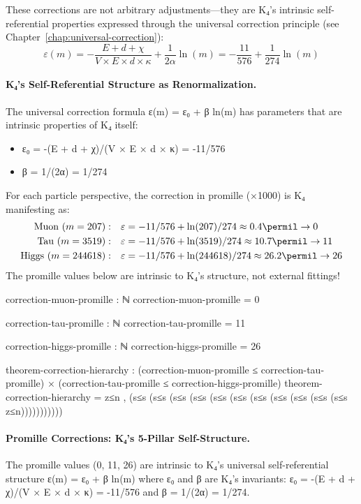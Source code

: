 \documentclass[11pt,a4paper]{book}
\begin{document}
These corrections are not arbitrary adjustments—they are K₄'s intrinsic self-referential properties expressed through the universal correction principle (see Chapter~\ref{chap:universal-correction}):
\[
\varepsilon(m) = -\frac{E + d + \chi}{V \times E \times d \times \kappa} + \frac{1}{2\alpha} \ln(m) = -\frac{11}{576} + \frac{1}{274} \ln(m)
\]

\paragraph{K₄'s Self-Referential Structure as Renormalization.}
The universal correction formula ε(m) = ε₀ + β ln(m) has parameters that are intrinsic properties of K₄ itself:
\begin{itemize}
\item ε₀ = -(E + d + χ)/(V × E × d × κ) = -11/576
\item β = 1/(2α) = 1/274
\end{itemize}
For each particle perspective, the correction in promille (×1000) is K₄ manifesting as:
\begin{align*}
\text{Muon } (m=207): \quad &\varepsilon = -11/576 + \ln(207)/274 \approx 0.4\permil \to 0 \\
\text{Tau } (m=3519): \quad &\varepsilon = -11/576 + \ln(3519)/274 \approx 10.7\permil \to 11 \\
\text{Higgs } (m=244618): \quad &\varepsilon = -11/576 + \ln(244618)/274 \approx 26.2\permil \to 26
\end{align*}
The promille values below are intrinsic to K₄'s structure, not external fittings!

\begin{code}
correction-muon-promille : ℕ
correction-muon-promille = 0

correction-tau-promille : ℕ
correction-tau-promille = 11

correction-higgs-promille : ℕ
correction-higgs-promille = 26

theorem-correction-hierarchy : (correction-muon-promille ≤ correction-tau-promille) × 
                                (correction-tau-promille ≤ correction-higgs-promille)
theorem-correction-hierarchy = z≤n , (s≤s (s≤s (s≤s (s≤s (s≤s (s≤s (s≤s (s≤s (s≤s (s≤s (s≤s z≤n)))))))))))

\end{code}

\paragraph{Promille Corrections: K₄'s 5-Pillar Self-Structure.}
The promille values (0, 11, 26) are intrinsic to K₄'s universal self-referential structure
ε(m) = ε₀ + β ln(m)
where ε₀ and β are K₄'s invariants:
ε₀ = -(E + d + χ)/(V × E × d × κ) = -11/576
and β = 1/(2α) = 1/274.
\end{document}
